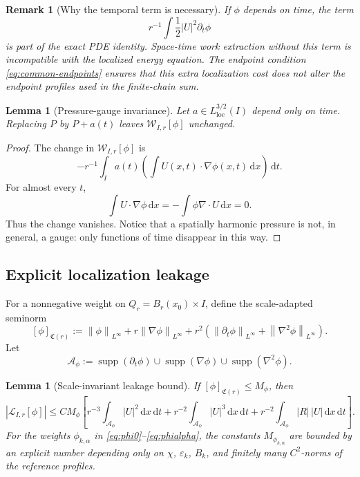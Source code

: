 \documentclass[10pt,a4paper]{amsart}
\numberwithin{equation}{section}
\newtheorem{lemma}[theorem]{Lemma}
\newtheorem{remark}[theorem]{Remark}
\DeclareMathOperator{\supp}{supp}
\newcommand{\eps}{\varepsilon}
\newcommand{\dx}{\,\mathrm dx}
\newcommand{\dt}{\,\mathrm dt}
\newcommand{\dxdt}{\,\mathrm dx\,\mathrm dt}
\newcommand{\norm}[2]{\left\lVert #1\right\rVert_{#2}}
\newcommand{\W}{\mathcal W}
\newcommand{\Lk}{\mathcal L}
\begin{document}
\begin{remark}[Why the temporal term is necessary]
If \(\phi\) depends on time, the term
\[
r^{-1}\int\frac12|U|^2\partial_t\phi
\]
is part of the exact PDE identity. Space-time work extraction without this term is incompatible with the localized energy equation. The endpoint condition \eqref{eq:common-endpoints} ensures that this extra localization cost does not alter the endpoint profiles used in the finite-chain sum.
\end{remark}

\begin{lemma}[Pressure-gauge invariance]\label{lem:gauge}
Let \(a\in L^{3/2}_{\mathrm{loc}}(I)\) depend only on time. Replacing \(P\) by \(P+a(t)\) leaves \(\W_{I,r}[\phi]\) unchanged.
\end{lemma}

\begin{proof}
The change in \(\W_{I,r}[\phi]\) is
\[
-r^{-1}\int_I a(t)
\left(\int U(x,t)\cdot\nabla\phi(x,t)\dx\right)\dt.
\]
For almost every \(t\),
\[
\int U\cdot\nabla\phi\dx
=-\int\phi\nabla\cdot U\dx=0.
\]
Thus the change vanishes. Notice that a spatially harmonic pressure is not, in general, a gauge: only functions of time disappear in this way.
\end{proof}

\subsection{Explicit localization leakage}\label{sec:leakage}

For a nonnegative weight on \(Q_r=B_r(x_0)\times I\), define the scale-adapted seminorm
\begin{equation}\label{eq:phi-seminorm}
[\phi]_{\mathfrak C(r)}
:=
\norm{\phi}{L^\infty}
+
r\norm{\nabla\phi}{L^\infty}
+
r^2\left(
\norm{\partial_t\phi}{L^\infty}
+
\norm{\nabla^2\phi}{L^\infty}
\right).
\end{equation}
Let
\begin{equation}\label{eq:derivative-region}
\mathscr A_\phi
:=
\supp(\partial_t\phi)
\cup
\supp(\nabla\phi)
\cup
\supp(\nabla^2\phi).
\end{equation}

\begin{lemma}[Scale-invariant leakage bound]\label{lem:leakage}
If \([\phi]_{\mathfrak C(r)}\le M_\phi\), then
\begin{equation}\label{eq:leakage-bound}
\boxed{
|\Lk_{I,r}[\phi]|
\le
C M_\phi
\left[
 r^{-3}\int_{\mathscr A_\phi}|U|^2\dxdt
+
 r^{-2}\int_{\mathscr A_\phi}|U|^3\dxdt
+
 r^{-2}\int_{\mathscr A_\phi}|R|\,|U|\dxdt
\right].
}
\end{equation}
For the weights \(\phi_{k,\alpha}\) in \eqref{eq:phi0}--\eqref{eq:phialpha}, the constants \(M_{\phi_{k,\alpha}}\) are bounded by an explicit number depending only on \(\chi\), \(\eps_k\), \(B_k\), and finitely many \(C^2\)-norms of the reference profiles.
\end{lemma}
\end{document}
